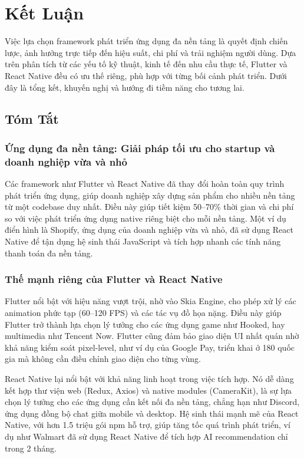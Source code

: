 \section{Kết Luận}


  Việc lựa chọn framework phát triển ứng dụng đa nền tảng là quyết định chiến lược, ảnh hưởng trực tiếp đến hiệu suất, chi phí và trải nghiệm người dùng. Dựa trên phân tích từ các yếu tố kỹ thuật, kinh tế đến nhu cầu thực tế, Flutter và React Native đều có ưu thế riêng, phù hợp với từng bối cảnh phát triển. Dưới đây là tổng kết, khuyến nghị và hướng đi tiềm năng cho tương lai.
\subsection{Tóm Tắt}
\subsubsection{Ứng dụng đa nền tảng: Giải pháp tối ưu cho startup và doanh nghiệp vừa và nhỏ}

    Các framework như Flutter và React Native đã thay đổi hoàn toàn quy trình phát triển ứng dụng, giúp doanh nghiệp xây dựng sản phẩm cho nhiều nền tảng từ một codebase duy nhất. Điều này giúp tiết kiệm 50–70\% thời gian và chi phí so với việc phát triển ứng dụng native riêng biệt cho mỗi nền tảng. Một ví dụ điển hình là Shopify, ứng dụng của doanh nghiệp vừa và nhỏ, đã sử dụng React Native để tận dụng hệ sinh thái JavaScript và tích hợp nhanh các tính năng thanh toán đa nền tảng.

\subsubsection{Thế mạnh riêng của Flutter và React Native}

    Flutter nổi bật với hiệu năng vượt trội, nhờ vào Skia Engine, cho phép xử lý các animation phức tạp (60–120 FPS) và các tác vụ đồ họa nặng. Điều này giúp Flutter trở thành lựa chọn lý tưởng cho các ứng dụng game như Hooked, hay multimedia như Tencent Now. Flutter cũng đảm bảo giao diện UI nhất quán nhờ khả năng kiểm soát pixel-level, như ví dụ của Google Pay, triển khai ở 180 quốc gia mà không cần điều chỉnh giao diện cho từng vùng.
\vspace{0.5em}


    React Native lại nổi bật với khả năng linh hoạt trong việc tích hợp. Nó dễ dàng kết hợp thư viện web (Redux, Axios) và native modules (CameraKit), là sự lựa chọn lý tưởng cho các ứng dụng cần kết nối đa nền tảng, chẳng hạn như Discord, ứng dụng đồng bộ chat giữa mobile và desktop. Hệ sinh thái mạnh mẽ của React Native, với hơn 1.5 triệu gói npm hỗ trợ, giúp tăng tốc quá trình phát triển, ví dụ như Walmart đã sử dụng React Native để tích hợp AI recommendation chỉ trong 2 tháng.

